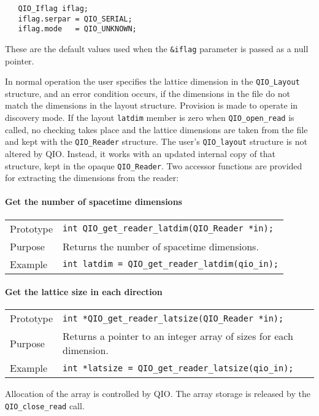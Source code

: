 \documentclass{article}
\begin{document}
%
\begin{verbatim}
   QIO_Iflag iflag;
   iflag.serpar = QIO_SERIAL;
   iflag.mode   = QIO_UNKNOWN;
\end{verbatim}
%
These are the default values used when the \verb|&iflag| parameter is
passed as a null pointer.


In normal operation the user specifies the lattice dimension in the
\verb|QIO_Layout| structure, and an error condition occurs, if the
dimensions in the file do not match the dimensions in the layout
structure.  Provision is made to operate in discovery mode.  If the
layout \verb|latdim| member is zero when \verb|QIO_open_read| is
called, no checking takes place and the lattice dimensions are taken
from the file and kept with the \verb|QIO_Reader| structure.  The
user's \verb|QIO_layout| structure is not altered by QIO\@.  Instead,
it works with an updated internal copy of that structure, kept in the
opaque \verb|QIO_Reader|.  Two accessor functions are provided for
extracting the dimensions from the reader:

\paragraph{Get the number of spacetime dimensions}

\begin{flushleft}
  \begin{tabular}{|l|l|}
  \hline
  Prototype      & \verb|int QIO_get_reader_latdim(QIO_Reader *in);| \\
  Purpose        & Returns the number of spacetime dimensions. \\
\hline
  Example  & \verb|int latdim = QIO_get_reader_latdim(qio_in);|\\
   \hline
 \end{tabular}
\end{flushleft}
%

\paragraph{Get the lattice size in each direction}

\begin{flushleft}
  \begin{tabular}{|l|l|}
  \hline
  Prototype      & \verb|int *QIO_get_reader_latsize(QIO_Reader *in);| \\
  Purpose        & Returns a pointer to an integer array of sizes for each dimension. \\
\hline
  Example  & \verb|int *latsize = QIO_get_reader_latsize(qio_in);|\\
   \hline
 \end{tabular}
\end{flushleft}
%
Allocation of the array is controlled by QIO\@.  The array storage is
released by the \verb|QIO_close_read| call.
\end{document}

